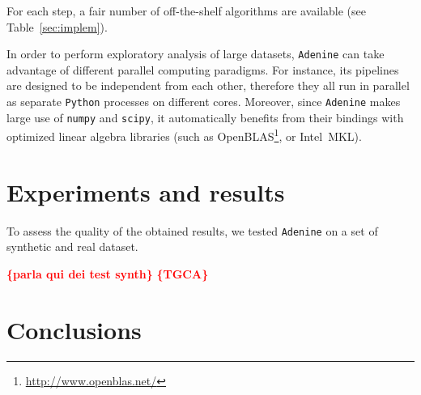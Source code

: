 \documentclass[twoside,11pt]{article}
\makeatletter
\newcommand{\ade}{\texttt{Adenine}\@\xspace}
\newcommand{\py}{\texttt{Python}\@\xspace}
\newcommand{\todo}[1]{\textcolor{red}{{\bf \{#1\}}}} %
\makeatother
\begin{document}
For each step, a fair number of off-the-shelf algorithms are available (see Table~\ref{sec:implem}).


In order to perform exploratory analysis of large datasets, \ade can take advantage of different parallel computing paradigms. For instance, its pipelines are designed to be independent from each other, therefore they all run in parallel as separate \py processes on different cores. Moreover, since \ade makes large use of \texttt{numpy} and \texttt{scipy}, it automatically benefits from their bindings with optimized linear algebra libraries (such as OpenBLAS\footnote{\href{http://www.openblas.net/}{http://www.openblas.net/}}, or Intel\textsuperscript{\textregistered}~MKL).

\section{Experiments and results}
To assess the quality of the obtained results, we tested \ade on a set of synthetic and real dataset.

\todo{parla qui dei test synth}
\todo{TGCA}

\section{Conclusions}



\end{document}
